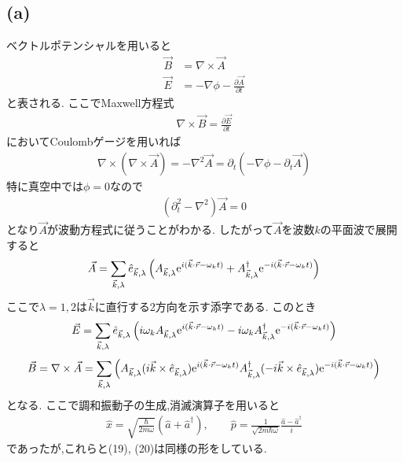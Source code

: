 \documentclass[uplatex,a4j,11pt,dvipdfmx]{jsarticle}
\begin{document}
\subsection*{(a)}
ベクトルポテンシャルを用いると
\begin{align*}
  \vec{B}&=\nabla\times\vec{A}\\
  \vec{E}&=-\nabla\phi-\frac{\partial\vec{A}}{\partial t}
\end{align*}
と表される.
ここでMaxwell方程式
\begin{align*}
  \nabla\times\vec{B}=\frac{\partial\vec{E}}{\partial t}
\end{align*}
においてCoulombゲージを用いれば
\begin{align*}
  \nabla\times(\nabla\times\vec{A})=-\nabla^2\vec{A}=\partial_t\left(-\nabla\phi-\partial_t\vec{A}\right)
\end{align*}
特に真空中では$\phi=0$なので
\begin{align*}
  (\partial_t^2-\nabla^2)\vec{A}=0
\end{align*}
となり$\vec{A}$が波動方程式に従うことがわかる.
したがって$\vec{A}$を波数$k$の平面波で展開すると
\begin{align}
  \vec{A}=\sum_{\vec{k},\lambda}\hat{e}_{\vec{k},\lambda}\left(A_{\vec{k},\lambda}{\rm e}^{i(\vec{k}\cdot\vec{r}-\omega_kt)}+A_{\vec{k},\lambda}^\dagger{\rm e}^{-i(\vec{k}\cdot\vec{r}-\omega_kt)}\right)
\end{align}
ここで$\lambda=1,2$は$\vec{k}$に直行する2方向を示す添字である.
このとき
\begin{align}
  \vec{E}=\sum_{\vec{k},\lambda}\hat{e}_{\vec{k},\lambda}\left(i\omega_k A_{\vec{k},\lambda}{\rm e}^{i(\vec{k}\cdot\vec{r}-\omega_kt)}-i\omega_k A_{\vec{k},\lambda}^\dagger{\rm e}^{-i(\vec{k}\cdot\vec{r}-\omega_kt)}\right)
\end{align}
\begin{align}
  \vec{B}=\nabla\times\vec{A}=\sum_{\vec{k},\lambda}\left(A_{\vec{k},\lambda}(i\vec{k}\times\hat{e}_{\vec{k},\lambda}){\rm e}^{i(\vec{k}\cdot\vec{r}-\omega_kt)}
  A_{\vec{k},\lambda}^\dagger(-i\vec{k}\times\hat{e}_{\vec{k},\lambda}){\rm e}^{-i(\vec{k}\cdot\vec{r}-\omega_kt)}\right)
\end{align}
となる.
ここで調和振動子の生成,消滅演算子を用いると
\begin{align*}
  \hat{x}=\sqrt{\frac{\hbar}{2m\omega}}(\hat{a}+\hat{a}^\dagger),\qquad\hat{p}=\frac{1}{\sqrt{2m\hbar\omega}}\frac{\hat{a}-\hat{a}^\dagger}{i}
\end{align*}
であったが,これらと(19), (20)は同様の形をしている.
\end{document}
